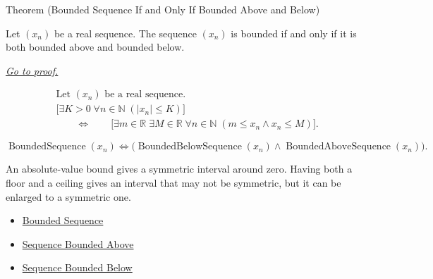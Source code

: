 
\begin{theorembox}{Theorem (Bounded Sequence If and Only If Bounded Above and Below)}
\begin{theorem}
\label{thm:bounded-sequence-iff-bounded-above-and-below}
Let $(x_n)$ be a real sequence. The sequence $(x_n)$ is bounded if and only
if it is both bounded above and bounded below.

\smallskip
\noindent
\hyperref[prf:bounded-sequence-iff-bounded-above-and-below]{\textit{Go to proof.}}
\end{theorem}
\end{theorembox}

\begin{remark*}
\[
\begin{aligned}
&\text{Let } (x_n) \text{ be a real sequence.}\\
&\bigl[
\exists K > 0\;
\forall n \in \mathbb{N}\;(|x_n| \le K)
\bigr]\\
&\qquad\Longleftrightarrow\qquad
\bigl[
\exists m \in \mathbb{R}\;
\exists M \in \mathbb{R}\;
\forall n \in \mathbb{N}\;(m \le x_n \land x_n \le M)
\bigr].
\end{aligned}
\]
\end{remark*}

\begin{remark*}
\[
\operatorname{BoundedSequence}(x_n)
\Longleftrightarrow
\bigl(
\operatorname{BoundedBelowSequence}(x_n)
\land
\operatorname{BoundedAboveSequence}(x_n)
\bigr).
\]
\end{remark*}

\begin{remark*}[Interpretation]
An absolute-value bound gives a symmetric interval around zero. Having both a
floor and a ceiling gives an interval that may not be symmetric, but it can be
enlarged to a symmetric one.
\end{remark*}

\begin{dependencies}
\begin{itemize}
  \item \hyperref[def:bounded-sequence]{Bounded Sequence}
  \item \hyperref[def:sequence-bounded-above]{Sequence Bounded Above}
  \item \hyperref[def:sequence-bounded-below]{Sequence Bounded Below}
\end{itemize}
\end{dependencies}

